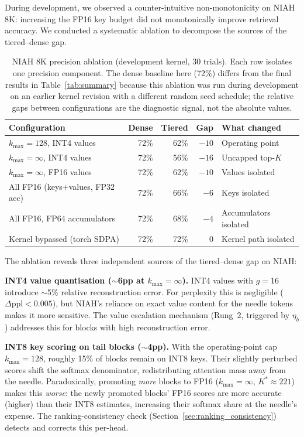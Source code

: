 \documentclass[10pt,twocolumn,a4paper]{article}
\theoremstyle{definition}
\theoremstyle{remark}
\begin{document}
During development, we observed a counter-intuitive non-monotonicity on NIAH 8K: increasing the FP16 key budget did not monotonically improve retrieval accuracy.  We conducted a systematic ablation to decompose the sources of the tiered--dense gap.

\begin{table}[!t]
\centering
\caption{NIAH 8K precision ablation (development kernel, 30 trials).  Each row isolates one precision component.  The dense baseline here (72\%) differs from the final results in Table~\ref{tab:summary} because this ablation was run during development on an earlier kernel revision with a different random seed schedule; the relative gaps between configurations are the diagnostic signal, not the absolute values.}
\label{tab:niah_ablation}
\small
\begin{tabular}{lrrrl}
\toprule
\textbf{Configuration} & \textbf{Dense} & \textbf{Tiered} & \textbf{Gap} & \textbf{What changed} \\
\midrule
$k_{\max}{=}128$, INT4 values & 72\% & 62\% & $-10$ & Operating point \\
$k_{\max}{=}\infty$, INT4 values & 72\% & 56\% & $-16$ & Uncapped top-$K$ \\
$k_{\max}{=}\infty$, FP16 values & 72\% & 62\% & $-10$ & Values isolated \\
All FP16 (keys+values, FP32 acc) & 72\% & 66\% & $-6$ & Keys isolated \\
All FP16, FP64 accumulators & 72\% & 68\% & $-4$ & Accumulators isolated \\
Kernel bypassed (torch SDPA) & 72\% & 72\% & $0$ & Kernel path isolated \\
\bottomrule
\end{tabular}
\end{table}

The ablation reveals three independent sources of the tiered--dense gap on NIAH:

\textbf{INT4 value quantisation ($\sim$6pp at $k_{\max}{=}\infty$).}  INT4 values with $g{=}16$ introduce $\sim$5\% relative reconstruction error.  For perplexity this is negligible ($\Delta\mathrm{ppl} < 0.005$), but NIAH's reliance on exact value content for the needle tokens makes it more sensitive.  The value escalation mechanism (Rung~2, triggered by $\eta_b$) addresses this for blocks with high reconstruction error.

\textbf{INT8 key scoring on tail blocks ($\sim$4pp).}  With the operating-point cap $k_{\max}{=}128$, roughly 15\% of blocks remain on INT8 keys.  Their slightly perturbed scores shift the softmax denominator, redistributing attention mass away from the needle.  Paradoxically, promoting \emph{more} blocks to FP16 ($k_{\max}{=}\infty$, $K^*{\approx}221$) makes this \emph{worse}: the newly promoted blocks' FP16 scores are more accurate (higher) than their INT8 estimates, increasing their softmax share at the needle's expense.  The ranking-consistency check (Section~\ref{sec:ranking_consistency}) detects and corrects this per-head.
\end{document}
